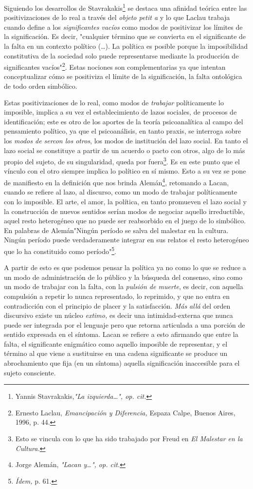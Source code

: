 Siguiendo los desarrollos de Stavrakakis\footnote{Yannis
  Stavrakakis,\emph{"La izquierda\ldots", op. cit.}} se destaca una
afinidad teórica entre las positivizaciones de lo real a través del
\emph{objeto petit a} y lo que Laclau trabaja cuando define a los
\emph{significantes vacíos} como modos de positivizar los límites de la
significación. Es decir, "cualquier término que se convierta en el
significante de la falta en un contexto político (\dots). La
política es posible porque la imposibilidad constitutiva de la sociedad
solo puede representarse mediante la producción de significantes
vacíos"\footnote{Ernesto Laclau, \emph{Emancipación y Diferencia,}
  Espaza Calpe, Buenos Aires, 1996, p. 44.}. Estas nociones son
complementarias ya que intentan conceptualizar cómo se positiviza el
límite de la significación, la falta ontológica de todo orden simbólico.

Estas positivizaciones de lo real, como modos de \emph{trabajar}
políticamente lo imposible, implica a su vez el establecimiento de lazos
sociales, de procesos de identificación; este es otro de los aportes de
la teoría psicoanalítica al campo del pensamiento político, ya que el
psicoanálisis, en tanto praxis, se interroga sobre los \emph{modos de
sercon los otros}, los modos de institución del lazo social. En tanto el
lazo social se constituye a partir de un acuerdo o pacto con otros, algo
de lo más propio del sujeto, de su singularidad, queda por
fuera\footnote{Esto se vincula con lo que ha sido trabajado por Freud en
  \emph{El Malestar en la Cultura.}}. Es en este punto que el vínculo
con el otro siempre implica lo político en sí mismo. Esto a su vez se
pone de manifiesto en la definición que nos brinda Alemán\footnote{Jorge
  Alemán, \emph{"Lacan y\ldots", op. cit.}}, retomando a Lacan, cuando
se refiere al lazo, al discurso, como un modo de trabajar políticamente
con lo imposible. El arte, el amor, la política, en tanto promueven el
lazo social y la construcción de nuevos sentidos serían modos de
negociar aquello irreductible, aquel resto heterogéneo que no puede ser
reabsorbido en el juego de lo simbólico. En palabras de Alemán"Ningún
período se salva del malestar en la cultura. Ningún período puede
verdaderamente integrar en sus relatos el resto heterogéneo que lo ha
constituido como período"\footnote{\emph{Ídem,} p. 61.}.

A partir de esto es que podemos pensar la política ya no como lo que se
reduce a un modo de administración de lo público y la búsqueda del
consenso, sino como un modo de trabajar con la falta, con la
\emph{pulsión de muerte}, es decir, con aquella compulsión a repetir lo
nunca representado, lo reprimido, y que no entra en contradicción con el
principio de placer y la satisfacción. \emph{Más allá} del orden
discursivo existe un núcleo \emph{extimo,} es decir una
intimidad-externa que nunca puede ser integrada por el lenguaje pero que
retorna articulada a una porción de sentido expresada en el síntoma.
Lacan se refiere a esto afirmando que entre la falta, el significante
enigmático como aquello imposible de representar, y el término al que
viene a sustituirse en una cadena significante se produce un
abrochamiento que fija (en un síntoma) aquella significación inaccesible
para el sujeto consciente.

